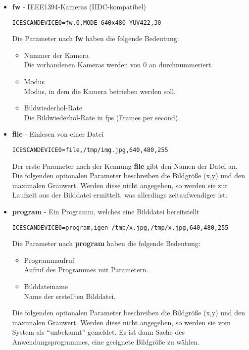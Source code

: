 \documentclass[10pt,titlepage]{article}
\begin{document}
{\begin{itemize}
\item {\bf fw} - IEEE1394-Kameras (IIDC-kompatibel)
\begin{verbatim}
ICESCANDEVICE0=fw,0,MODE_640x480_YUV422,30
\end{verbatim}
Die Parameter nach {\bf fw} haben die folgende Bedeutung:
\begin{itemize}
\item Nummer der Kamera\\
Die vorhandenen Kameras werden von 0 an durchnummeriert.
\item Modus\\
Modus, in dem die Kamera betrieben werden soll.
\item Bildwiederhol-Rate\\
Die Bildwiederhol-Rate in fps (Frames per second).
\end{itemize}

\item {\bf file} - Einlesen von einer Datei
\begin{verbatim}
ICESCANDEVICE0=file,/tmp/img.jpg,640,480,255
\end{verbatim}
Der erste Parameter nach der Kennung {\bf file } gibt den Namen der Datei an. 
Die folgenden optionalen Parameter beschreiben die Bildgröße (x,y) und den 
maximalen Grauwert. Werden diese nicht angegeben, so werden sie zur Laufzeit 
aus der Bilddatei ermittelt, was allerdings zeitaufwendiger ist.

\item {\bf program} - Ein Programm, welches eine Bilddatei bereitstellt
\begin{verbatim}
ICESCANDEVICE0=program,igen /tmp/x.jpg,/tmp/x.jpg,640,480,255
\end{verbatim}
Die Parameter nach {\bf program} haben die folgende Bedeutung:
\begin{itemize}
\item Programmaufruf\\
Aufruf des Programmes mit Parametern.
\item Bilddateiname\\
Name der erstellten Bilddatei.
\end{itemize}
Die folgenden optionalen Parameter beschreiben die Bildgröße (x,y) und 
den maximalen Grauwert. Werden diese nicht angegeben, so werden sie 
vom System als ``unbekannt'' gemeldet. Es ist dann Sache des
Anwendungsprogrammes, eine geeignete Bildgröße zu wählen.

\end{itemize}
 
}
\end{document}
